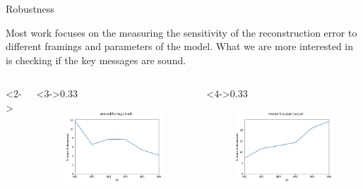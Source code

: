 \documentclass[9pt]{beamer}
\begin{document}
\begin{frame}{Robustness}

Most work focuses on the measuring the sensitivity of the reconstruction error to different framings and parameters of the model. What we are more interested in is checking if the key messages are sound.

\begin{columns}<2->
	\begin{column}<3->{0.33\linewidth}
		\begin{figure}
			\includegraphics[width=\linewidth]{../plots/aero_share}
		\end{figure}
	\end{column}

	\begin{column}<4->{0.33\linewidth}
		\begin{figure}
			\includegraphics[width=\linewidth]{../plots/sus_share}
		\end{figure}
	\end{column}


\end{columns}
\end{frame}
\end{document}
